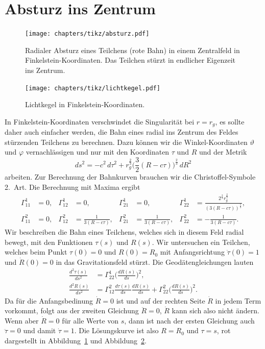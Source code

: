 \section{Absturz ins Zentrum}
\begin{figure}
\centering
\texttt{[image: chapters/tikz/absturz.pdf]}
\caption{Radialer Absturz eines Teilchens (rote Bahn) in einem Zentralfeld
in Finkelstein-Koordinaten.
Das Teilchen stürzt in endlicher Eigenzeit ins Zentrum.
\label{skript:kruemmung:fig:absturz}}
\end{figure}
\begin{figure}
\centering
\texttt{[image: chapters/tikz/lichtkegel.pdf]}
\caption{Lichtkegel in Finkelstein-Koordinaten.
\label{skript:kruemmung:fig:lichtkegel-finkel}}
\end{figure}
In Finkelstein-Koordinaten verschwindet die Singularität bei $r=r_g$,
es sollte daher auch einfacher werden, die Bahn eines radial ins
Zentrum des Feldes stürzenden Teilchens zu berechnen.
Dazu können wir die Winkel-Koordinaten $\vartheta$ und $\varphi$
vernachlässigen und nur mit den Koordinaten $\tau$ und $R$ und der
Metrik
\[
ds^2
=
-c^2 \,d\tau^2
+r _g^{\frac23}\biggl(\frac32(R-c\tau)\biggr)^{\frac23}\,dR^2
\]
arbeiten.
Zur Berechnung der Bahnkurven brauchen wir die Christoffel-Symbole
2.~Art.
Die Berechnung mit Maxima ergibt
\begin{align*}
\Gamma^1_{11} &= 0,&
\Gamma^1_{12} &= 0,&
\Gamma^1_{21} &= 0,&
\Gamma^1_{22} &= \frac{2^{\frac23}r_g^{\frac23}}{(3(R-c\tau))^{\frac53}},\\
\Gamma^2_{11} &= 0,&
\Gamma^2_{12} &= \frac1{3(R-c\tau)},&
\Gamma^2_{21} &= \frac1{3(R-c\tau)},&
\Gamma^2_{22} &= -\frac1{3(R-c\tau)}.
\end{align*}
Wir beschreiben die Bahn eines Teilchens, welches sich in diesem Feld
radial bewegt, mit den Funktionen $\tau(s)$ und $R(s)$.
Wir untersuchen ein Teilchen, welches beim Punkt $\tau(0)=0$ und $R(0)=R_0$
mit Anfangsrichtung $\dot\tau(0)=1$ und $\dot R(0)=0$ in das Gravitationsfeld
stürzt.
Die Geodätengleichungen lauten
\begin{align*}
\frac{d^2\tau(s)}{ds^2}
&=
\Gamma^1_{22}\biggl(\frac{dR(s)}{ds}\biggr)^2,
\\
\frac{d^2R(s)}{ds^2}
&=
\Gamma^2_{12}\frac{d\tau(s)}{ds}\frac{dR(s)}{ds}
+
\Gamma^2_{22}\biggl(\frac{dR(s)}{ds}\biggr)^2.
\end{align*}
Da für die Anfangsbedinung $\dot R=0$ ist und auf der rechten Seite
$\dot R$ in jedem Term vorkommt, folgt aus der zweiten Gleichung
$\ddot R=0$, $\dot R$ kann sich also nicht ändern.
Wenn aber $\dot R=0$ für alle Werte von $s$, dann ist nach der ersten
Gleichung auch $\ddot \tau=0$ und damit $\dot \tau=1$.
Die Lösungskurve ist also $R=R_0$ und $\tau=s$, rot dargestellt in
Abbildung~\ref{skript:kruemmung:fig:absturz}
und
Abbildung~\ref{skript:kruemmung:fig:lichtkegel-finkel}.

